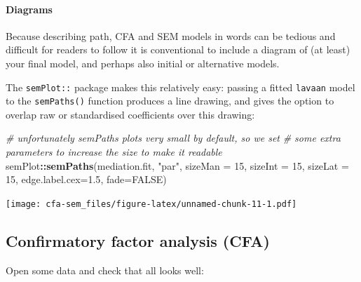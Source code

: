 \documentclass[]{article}
\newenvironment{Shaded}{\begin{snugshade}}{\end{snugshade}}
\newcommand{\KeywordTok}[1]{\textcolor[rgb]{0.13,0.29,0.53}{\textbf{#1}}}
\newcommand{\DataTypeTok}[1]{\textcolor[rgb]{0.13,0.29,0.53}{#1}}
\newcommand{\DecValTok}[1]{\textcolor[rgb]{0.00,0.00,0.81}{#1}}
\newcommand{\FloatTok}[1]{\textcolor[rgb]{0.00,0.00,0.81}{#1}}
\newcommand{\StringTok}[1]{\textcolor[rgb]{0.31,0.60,0.02}{#1}}
\newcommand{\CommentTok}[1]{\textcolor[rgb]{0.56,0.35,0.01}{\textit{#1}}}
\newcommand{\OtherTok}[1]{\textcolor[rgb]{0.56,0.35,0.01}{#1}}
\newcommand{\OperatorTok}[1]{\textcolor[rgb]{0.81,0.36,0.00}{\textbf{#1}}}
\newcommand{\NormalTok}[1]{#1}
\let\oldparagraph\paragraph
\renewcommand{\paragraph}[1]{\oldparagraph{#1}\mbox{}}
\theoremstyle{definition}
\theoremstyle{definition}
\theoremstyle{definition}
\theoremstyle{remark}
\begin{document}
\paragraph{Diagrams}\label{diagrams}

Because describing path, CFA and SEM models in words can be tedious and
difficult for readers to follow it is conventional to include a diagram
of (at least) your final model, and perhaps also initial or alternative
models.

The \texttt{semPlot::} package makes this relatively easy: passing a
fitted \texttt{lavaan} model to the \texttt{semPaths()} function
produces a line drawing, and gives the option to overlap raw or
standardised coefficients over this drawing:

\begin{Shaded}
\begin{Highlighting}[]
\CommentTok{# unfortunately semPaths plots very small by default, so we set}
\CommentTok{# some extra parameters to increase the size to make it readable}
\NormalTok{semPlot}\OperatorTok{::}\KeywordTok{semPaths}\NormalTok{(mediation.fit, }\StringTok{"par"}\NormalTok{,}
             \DataTypeTok{sizeMan =} \DecValTok{15}\NormalTok{, }\DataTypeTok{sizeInt =} \DecValTok{15}\NormalTok{, }\DataTypeTok{sizeLat =} \DecValTok{15}\NormalTok{,}
             \DataTypeTok{edge.label.cex=}\FloatTok{1.5}\NormalTok{, }
             \DataTypeTok{fade=}\OtherTok{FALSE}\NormalTok{)}
\end{Highlighting}
\end{Shaded}

\texttt{[image: cfa-sem\_files/figure-latex/unnamed-chunk-11-1.pdf]}

\hypertarget{cfa}{\subsection*{Confirmatory factor analysis
(CFA)}\label{cfa}}

Open some data and check that all looks well:
\end{document}
